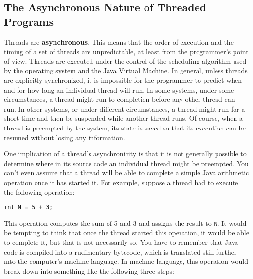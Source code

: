 \subsection{The Asynchronous Nature of Threaded Programs}
\noindent Threads are {\bf asynchronous}. This means that the order of execution
and the timing of a set of threads are unpredictable, at
least from the programmer's point of view.  Threads are executed under
the control of the scheduling algorithm used by the operating system
and the Java Virtual Machine.  In general, unless threads are
explicitly synchronized, it is impossible for the programmer to
predict when and for how long an individual thread will
run.  In some systems, under some circumstances, a thread might run to
completion before any other thread can run.  In other systems, or
under different circumstances, a thread might run for a short time and
then be suspended while another thread runs. Of course, when a thread
is preempted by the system, its state is saved so that its execution
can be resumed without losing any information.

One implication of a thread's asynchronicity is that it is not
generally possible to determine where in its source code an individual
thread might be preempted.  You can't even assume that a thread will
be able to complete a simple Java arithmetic operation once it has started
it.   For example, suppose a thread had to execute the following
operation:

\begin{jjjlisting}
\begin{lstlisting}
int N = 5 + 3;
\end{lstlisting}
\end{jjjlisting}

\noindent This operation computes the sum of 5 and 3 and assigns the result to
{\tt N}.  It would be tempting to think that once the thread started
this operation, it would be able to complete it, but that is not
necessarily so.  You have to remember that Java code is compiled into
a rudimentary bytecode, which is translated still further into
the computer's machine language.   In machine language, this operation
would break down into something like the following three steps:

